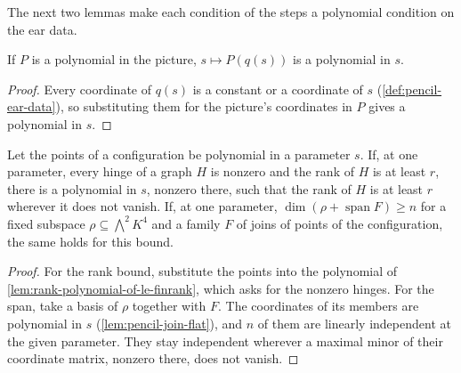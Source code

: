 The next two lemmas make each condition of the steps a polynomial
condition on the ear data.

\begin{lemma}
  \label{lem:pencil-ear-data-picture}
  \leanok
  If $P$ is a polynomial in the picture, $s \mapsto P(q(s))$ is a polynomial in $s$.
\end{lemma}
\begin{proof}
  \leanok
  Every coordinate of $q(s)$ is a constant or a coordinate of $s$ (\cref{def:pencil-ear-data}), so
  substituting them for the picture's coordinates in $P$ gives a polynomial in $s$.
\end{proof}

\begin{lemma}
  \label{lem:pencil-ear-data-open}
  \leanok
  Let the points of a configuration be polynomial in a parameter $s$. If, at one parameter,
  every hinge of a graph $H$ is nonzero and the rank of $H$ is at least $r$, there is a
  polynomial in $s$, nonzero there, such that the rank of $H$ is at least $r$ wherever it does
  not vanish. If, at one parameter, $\dim(\rho + \operatorname{span} F) \ge n$ for a fixed
  subspace $\rho \subseteq \bigwedge^2 K^4$ and a family $F$ of joins of points of the
  configuration, the same holds for this bound.
\end{lemma}
\begin{proof}
  \leanok
  For the rank bound, substitute the points into the polynomial of
  \cref{lem:rank-polynomial-of-le-finrank}, which asks for the nonzero hinges. For the span, take a
  basis of $\rho$ together with $F$. The coordinates of its members are polynomial in $s$
  (\cref{lem:pencil-join-flat}), and $n$ of them are linearly independent at the given parameter.
  They stay independent wherever a maximal minor of their coordinate matrix, nonzero there, does
  not vanish.
\end{proof}

